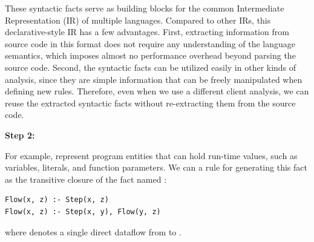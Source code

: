 These syntactic facts serve as building blocks for the
common Intermediate Representation (IR) of multiple languages.
Compared to other IRs, this declarative-style IR has a few advantages.
First, extracting information from source code in this format does not
require any understanding of the language semantics, which imposes
almost no performance overhead beyond parsing the source code.
Second, the syntactic facts can be utilized easily in other kinds of
analysis, since they are simple information that can be freely
manipulated when defining new rules. Therefore, even when we use a different
client analysis, we can reuse the extracted syntactic facts
without re-extracting them from the source code.

\smallskip
\textbf{Step 2: }

For example,  represent program entities that can hold
run-time values, such as variables, literals, and function parameters.  We
can  a rule for generating this fact as the transitive closure of the fact named
:

\begin{lstlisting}[style=mrule]
Flow(x, z) :- Step(x, z)
Flow(x, z) :- Step(x, y), Flow(y, z)
\end{lstlisting}

\noindent
where  denotes a single direct dataflow from  to . 


